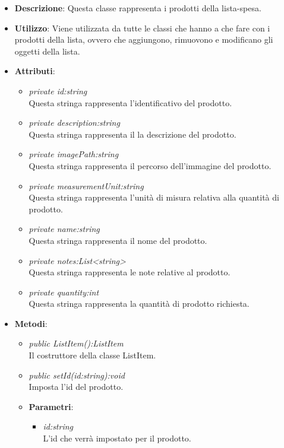 \begin{itemize}
\item \textbf{Descrizione}: Questa classe rappresenta i prodotti della lista-spesa.
\item \textbf{Utilizzo}: Viene utilizzata da tutte le classi che hanno a che fare con i prodotti della lista, ovvero che aggiungono, rimuovono e modificano gli oggetti della lista.
\item \textbf{Attributi}: 
	\begin{itemize}
	\item \textit{private id:string}\\
		Questa stringa rappresenta l'identificativo del prodotto.
	\item \textit{private description:string}\\
	Questa stringa rappresenta il la descrizione del prodotto.
	\item \textit{private imagePath:string}\\
		Questa stringa rappresenta il percorso dell'immagine del prodotto.
	\item \textit{private measurementUnit:string}\\
	Questa stringa rappresenta l'unità di misura relativa alla quantità di prodotto.
	\item \textit{private name:string}\\
	Questa stringa rappresenta il nome del prodotto.
	\item \textit{private notes:List<string>}\\
	Questa stringa rappresenta le note relative al prodotto.
	\item \textit{private quantity:int}\\
	Questa stringa rappresenta la quantità di prodotto richiesta.
	\end{itemize}
\item \textbf{Metodi}:
	\begin{itemize}
	\item \textit{public ListItem():ListItem}\\
	Il costruttore della classe ListItem.
	\item \textit{public setId(id:string):void}\\
	Imposta l'id del prodotto.
				\item{\textbf{Parametri}: \begin{itemize}
				\item \textit{id:string}\\
						L'id che verrà impostato per il prodotto.

\end{itemize}}
\end{itemize}
\end{itemize}
